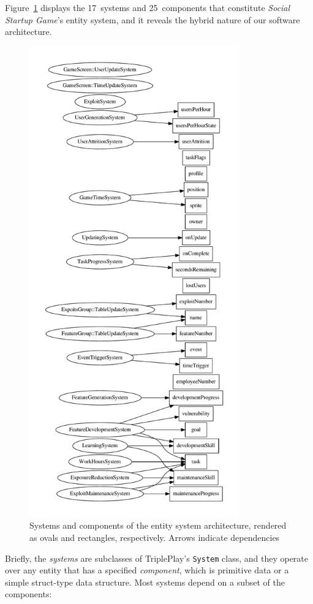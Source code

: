 \documentclass[letterpaper]{article}
\begin{document}
Figure~\ref{fig:sys-dep} displays the 17~systems and 25~components
that constitute \textit{Social Startup Game}'s entity system, and it
reveals the hybrid nature of our software architecture.
%
\begin{figure}
\centering
\includegraphics[height=8in]{sys-dep.pdf}
\caption{Systems and components of the entity system architecture, rendered as ovals and rectangles, respectively. Arrows indicate dependencies}
\label{fig:sys-dep}
\end{figure}
%
Briefly, the
\textit{systems} are subclasses of TriplePlay's \texttt{System} class,
and they operate over any entity that has a specified
\textit{component}, which is primitive data or a simple struct-type
data structure.  Most systems depend on a subset of the components:
\end{document}
